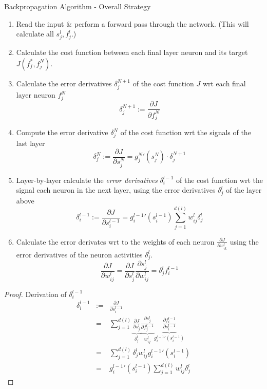 \documentclass[11pt,a4paper]{article}
\begin{document}
  \begin{proposition}{Backpropagation Algorithm - Overall Strategy}
    \begin{enumerate}
      \item Read the input \& perform a forward pass through the network. (This will calculate all $s_j^l,f_j^l$.)
      \item Calculate the cost function between each final layer neuron and its target $J(f_j^*,f_j^N)$.
      \item Calculate the error derivatives $\delta_j^{N+1}$ of the cost function $J$ wrt each final layer neuron $f_j^N$
      \[ \delta_j^{N+1}:=\frac{\partial J}{\partial f_j^N} \]
      \item Compute the error derivative $\delta_j^N$ of the cost function wrt the signals of the last layer
      \[ \delta_j^N:=\frac{\partial J}{\partial s_j^N}=g_j^N'(s_j^N)\cdot\delta_j^{N+1} \]
      \item Layer-by-layer calculate the \textit{error derivatives} $\delta_i^{l-1}$ of the cost function wrt the signal each neuron in the next layer, using the error derivatives $\delta_j^l$ of the layer above
      \[ \delta_i^{l-1}:=\frac{\partial J}{\partial s_i^{l-1}}=g_i^{l-1}'(s_i^{l-1})\sum_{j=1}^{d(l)}w_{ij}^l\delta_j^l \]
      \item Calculate the error derivates wrt to the weights of each neuron $\frac{\partial J}{\partial w_{ik}^l}$ using the error derivatives of the neuron activities $\delta_j^l$.
      \[ \frac{\partial J}{\partial w_{ij}^l}=\frac{\partial J}{\partial s_j^l}\frac{\partial s_j^l}{\partial w_{ij}^l}=\delta_j^lf_i^{l-1} \]
    \end{enumerate}
  \end{proposition}

  \begin{proof}{Derivation of $\delta_i^{l-1}$}
    \[\begin{array}{rrl}
      \delta_i^{l-1}&:=&\frac{\partial J}{\partial s_i^{l-1}}\\
      &=&\displaystyle\sum_{j=1}^{d(l)}\underbrace{\frac{\partial J}{\partial s_j^l}}_{\delta_j^l} \underbrace{\frac{\partial s_j^l}{\partial f_j^{l-1}}}_{w_{ij}^l} \underbrace{\frac{\partial f_i^{l-1}}{\partial s_i^{l-1}}}_{g^{l-1}_i'(s_i^{l-1})}\\
      &=&\displaystyle\sum_{j=1}^{d(l)}\delta_j^lw_{ij}^lg_i^{l-1}'(s_i^{l-1})\\
      &=&\displaystyle g_i^{l-1}'(s_i^{l-1})\sum_{j=1}^{d(l)}w_{ij}^l\delta_j^l
      \end{array}\]
  \end{proof}
\end{document}
